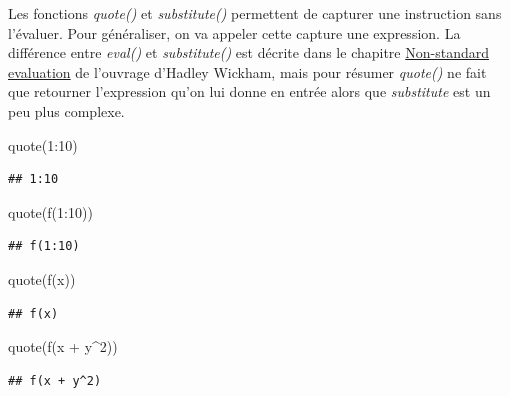 \documentclass[
]{book}
\newenvironment{Shaded}{\begin{snugshade}}{\end{snugshade}}
\newcommand{\DecValTok}[1]{\textcolor[rgb]{0.00,0.00,0.81}{#1}}
\newcommand{\FunctionTok}[1]{\textcolor[rgb]{0.00,0.00,0.00}{#1}}
\newcommand{\NormalTok}[1]{#1}
\newcommand{\SpecialCharTok}[1]{\textcolor[rgb]{0.00,0.00,0.00}{#1}}
\theoremstyle{definition}
\theoremstyle{definition}
\theoremstyle{definition}
\theoremstyle{definition}
\theoremstyle{remark}
\begin{document}
Les fonctions \emph{quote()} et \emph{substitute()} permettent de capturer une instruction sans l'évaluer. Pour généraliser, on va appeler cette capture une expression. La différence entre \emph{eval()} et \emph{substitute()} est décrite dans le chapitre \href{http://adv-r.had.co.nz/Computing-on-the-language.html}{Non-standard evaluation} de l'ouvrage d'Hadley Wickham, mais pour résumer \emph{quote()} ne fait que retourner l'expression qu'on lui donne en entrée alors que \emph{substitute} est un peu plus complexe.

\begin{Shaded}
\begin{Highlighting}[]
\FunctionTok{quote}\NormalTok{(}\DecValTok{1}\SpecialCharTok{:}\DecValTok{10}\NormalTok{)}
\end{Highlighting}
\end{Shaded}

\begin{verbatim}
## 1:10
\end{verbatim}

\begin{Shaded}
\begin{Highlighting}[]
\FunctionTok{quote}\NormalTok{(}\FunctionTok{f}\NormalTok{(}\DecValTok{1}\SpecialCharTok{:}\DecValTok{10}\NormalTok{))}
\end{Highlighting}
\end{Shaded}

\begin{verbatim}
## f(1:10)
\end{verbatim}

\begin{Shaded}
\begin{Highlighting}[]
\FunctionTok{quote}\NormalTok{(}\FunctionTok{f}\NormalTok{(x))}
\end{Highlighting}
\end{Shaded}

\begin{verbatim}
## f(x)
\end{verbatim}

\begin{Shaded}
\begin{Highlighting}[]
\FunctionTok{quote}\NormalTok{(}\FunctionTok{f}\NormalTok{(x }\SpecialCharTok{+}\NormalTok{ y}\SpecialCharTok{\^{}}\DecValTok{2}\NormalTok{))}
\end{Highlighting}
\end{Shaded}

\begin{verbatim}
## f(x + y^2)
\end{verbatim}
\end{document}
